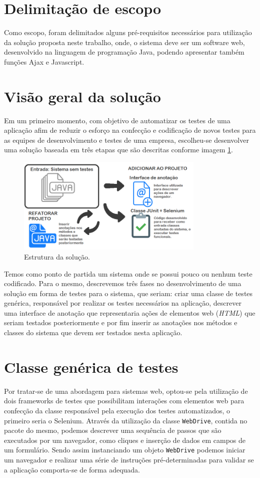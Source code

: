 \documentclass[tg]{mdtufsm}
\begin{document}
\section{Delimitação de escopo}

Como escopo, foram delimitados alguns pré-requisitos necessários para utilização da solução proposta neste trabalho, onde, o sistema deve ser um software web, desenvolvido na linguagem de programação Java,
podendo apresentar também funções Ajax e Javascript.

\section{Visão geral da solução}
Em um primeiro momento, com objetivo de automatizar os testes de uma aplicação afim de reduzir o esforço na confecção e codificação de novos testes para as equipes de desenvolvimento e testes de uma empresa,
escolheu-se desenvolver uma solução baseada em três etapas que são descritas conforme imagem \ref{fig:solucao1}.

\begin{figure}[!htb]
	\centering
	\includegraphics[width=0.8\textwidth]{solucao1}
	\caption{Estrutura da solução.}
	\label{fig:solucao1}
\end{figure}

Temos como ponto de partida um sistema onde se possui pouco ou nenhum teste codificado. Para o mesmo, descrevemos  três fases no desenvolvimento de uma solução em forma de testes para o sistema,
que seriam: criar uma classe de testes genérica, responsável por realizar os testes necessários na aplicação, descrever uma interface de anotação que representaria ações de elementos web (\emph{HTML}) que
seriam testados posteriormente e por fim inserir as anotações nos métodos e classes do sistema que devem ser testados nesta aplicação.

\section{Classe genérica de testes}
Por tratar-se de uma abordagem para sistemas web, optou-se pela utilização de dois frameworks de testes que possibilitam interações com elementos web para confecção da classe responsável pela execução dos testes automatizados,
o primeiro seria o Selenium. Através da utilização da classe \texttt{WebDrive}, contida no pacote do mesmo, podemos descrever uma sequência de passos que são executados por um navegador, como cliques e inserção de dados em campos de um
formulário. Sendo assim instanciando um objeto \texttt{WebDrive} podemos iniciar um navegador e realizar uma série de instruções pré-determinadas para validar se a aplicação comporta-se de forma adequada.
\end{document}
